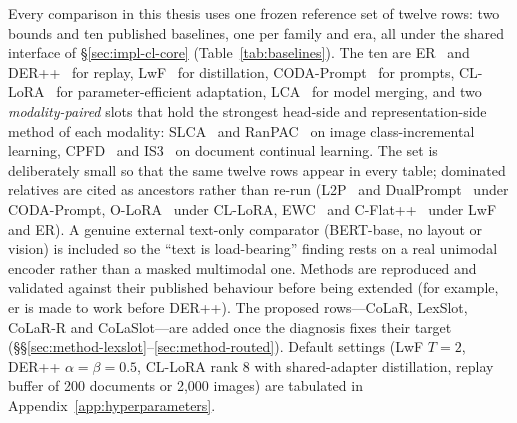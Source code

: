 Every comparison in this thesis uses one frozen reference set of twelve rows: two bounds
and ten published baselines, one per family and era, all under the shared interface of
\S\ref{sec:impl-cl-core} (Table~\ref{tab:baselines}). The ten are ER~\citep{rolnick2019er}
and DER++~\citep{buzzega2020der} for replay, LwF~\citep{li2017lwf} for distillation,
CODA-Prompt~\citep{smith2023coda} for prompts, CL-LoRA~\citep{he2025cllora} for
parameter-efficient adaptation, LCA~\citep{lca2026} for model merging, and two
\emph{modality-paired} slots that hold the strongest head-side and representation-side
method of each modality: SLCA~\citep{zhang2023slca} and RanPAC~\citep{mcdonnell2023ranpac}
on image class-incremental learning, CPFD~\citep{zhang2023cpfd} and IS3~\citep{chen2024is3}
on document continual learning. The set is deliberately small so that the same twelve rows
appear in every table; dominated relatives are cited as ancestors rather than re-run
(L2P~\citep{wang2022l2p} and DualPrompt~\citep{wang2022dualprompt} under CODA-Prompt,
O-LoRA~\citep{wang2023olora} under CL-LoRA, EWC~\citep{kirkpatrick2017ewc} and
C-Flat++~\citep{bian2024cflat} under LwF and ER). A genuine external text-only
comparator (BERT-base, no layout or vision) is included so the ``text is load-bearing''
finding rests on a real unimodal encoder rather than a masked multimodal one. Methods
are reproduced and validated against their published behaviour before being extended
(for example, \gls{er} is made to work before DER++). The proposed rows---CoLaR,
LexSlot, CoLaR-R and CoLaSlot---are added once the diagnosis fixes their target
(\S\S\ref{sec:method-lexslot}--\ref{sec:method-routed}). Default settings (LwF
$T{=}2$, DER++ $\alpha{=}\beta{=}0.5$, CL-LoRA rank 8 with shared-adapter distillation,
replay buffer of 200 documents or 2{,}000 images) are tabulated in
Appendix~\ref{app:hyperparameters}.

